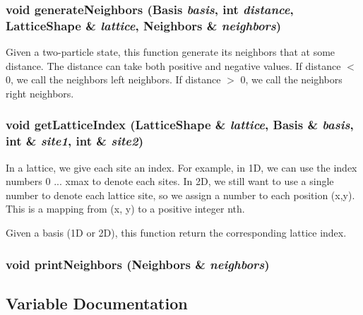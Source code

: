 \subsubsection{\setlength{\rightskip}{0pt plus 5cm}void generate\-Neighbors (\bf{Basis} {\em basis}, int {\em distance}, \bf{Lattice\-Shape} \& {\em lattice}, \bf{Neighbors} \& {\em neighbors})}\label{basis_8h_dc70ab0ee39f9e60d46e18d6c26e4156}


Given a two-particle state, this function generate its neighbors that at some distance. The distance can take both positive and negative values. If distance $<$ 0, we call the neighbors left neighbors. If distance $>$ 0, we call the neighbors right neighbors. 
\subsubsection{\setlength{\rightskip}{0pt plus 5cm}void get\-Lattice\-Index (\bf{Lattice\-Shape} \& {\em lattice}, \bf{Basis} \& {\em basis}, int \& {\em site1}, int \& {\em site2})}\label{basis_8h_c79dd08aec760821bccb305800cd4887}


In a lattice, we give each site an index. For example, in 1D, we can use the index numbers 0 ... xmax to denote each sites. In 2D, we still want to use a single number to denote each lattice site, so we assign a number to each position (x,y). This is a mapping from (x, y) to a positive integer nth.

Given a basis (1D or 2D), this function return the corresponding lattice index. 
\subsubsection{\setlength{\rightskip}{0pt plus 5cm}void print\-Neighbors (\bf{Neighbors} \& {\em neighbors})}\label{basis_8h_11e3efa510cb0e8f09015278644f1c0d}




\subsection{Variable Documentation}
